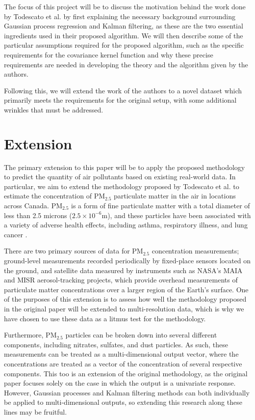 \documentclass[12pt]{article}
\numberwithin{equation}{section}
\numberwithin{figure}{section}
\numberwithin{table}{section}
\newcommand{\PM}[1]{\textrm{PM}_{#1}}
\begin{document}
The focus of this project will be to discuss the motivation behind the work done by Todescato et al. by first explaining the necessary background surrounding Gaussian process regression and Kalman filtering, as these are the two essential ingredients used in their proposed algorithm. We will then describe some of the particular assumptions required for the proposed algorithm, such as the specific requirements for the covariance kernel function and why these precise requirements are needed in developing the theory and the algorithm given by the authors.

Following this, we will extend the work of the authors to a novel dataset which primarily meets the requirements for the original setup, with some additional wrinkles that must be addressed.

\section{Extension}\label{sec:extensions}

The primary extension to this paper will be to apply the proposed methodology to predict the quantity of air pollutants based on existing real-world data. In particular, we aim to extend the methodology proposed by Todescato et al. to estimate the concentration of $\PM{2.5}$ particulate matter in the air in locations across Canada. $\PM{2.5}$ is a form of fine particulate matter with a total diameter of less than 2.5 microns ($2.5 \times 10^{-6}$m), and these particles have been associated with a variety of adverse health effects, including asthma, respiratory illness, and lung cancer \citep{Chu-PM25-Review-2016, Kianian-Multi-Res-Impute-2021}. 

There are two primary sources of data for $\PM{2.5}$ concentration measurements; ground-level measurements recorded periodically by fixed-place sensors located on the ground, and satellite data measured by instruments such as NASA's MAIA and MISR aerosol-tracking projects, which provide overhead measurements of particulate matter concentrations over a larger region of the Earth's surface. One of the purposes of this extension is to assess how well the methodology proposed in the original paper will be extended to multi-resolution data, which is why we have chosen to use these data as a litmus test for the methodology.

Furthermore, $\PM{2.5}$ particles can be broken down into several different components, including nitrates, sulfates, and dust particles. As such, these measurements can be treated as a multi-dimensional output vector, where the concentrations are treated as a vector of the concentration of several respective components. This too is an extension of the original methodology, as the original paper focuses solely on the case in which the output is a univariate response. However, Gaussian processes and Kalman filtering methods can both individually be applied to multi-dimensional outputs, so extending this research along these lines may be fruitful.

\clearpage


\end{document}
